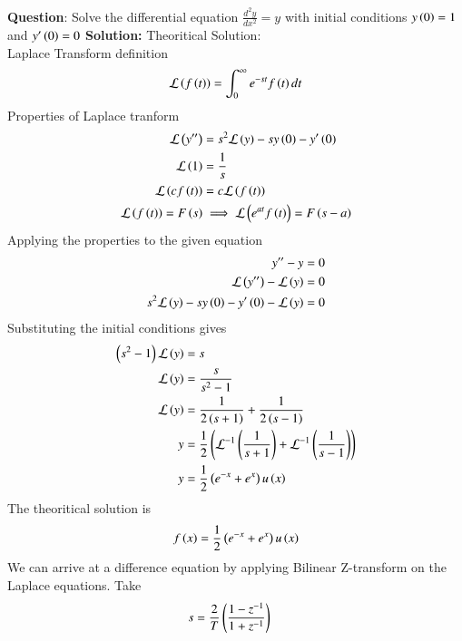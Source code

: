 \documentclass[journal]{IEEEtran}
\begin{document}
\textbf{Question}:\newline
Solve the differential equation $\frac{d^2y}{dx^2} = y$ with initial conditions $y\left(0\right) = 1$ and $y^{\prime}\left(0\right) = 0$
\newline
\textbf{Solution: }
\newline
Theoritical Solution:\\
Laplace Transform definition\\
\begin{align}
	\mathcal{L}\left(f\left(t\right)\right) = \int_{0}^{\infty}e^{-st}f\left(t\right)dt
\end{align}
Properties of Laplace tranform
\begin{align}
	\mathcal{L}\left(y^{\prime\prime}\right) &= s^2\mathcal{L}\left(y\right) -sy\left(0\right)-y^\prime\left(0\right)\\
	\mathcal{L}\left(1\right) &= \frac{1}{s}\\
	\mathcal{L}\left(cf\left(t\right)\right) &= c\mathcal{L}\left(f\left(t\right)\right)\\
	\mathcal{L}\left(f\left(t\right)\right) = F\left(s\right) &\implies \mathcal{L}\left(e^{at}f\left(t\right)\right) = F\left(s-a\right)
\end{align}
Applying the properties to the given equation
\begin{align}
	y^{\prime\prime} - y &= 0\\
	\mathcal{L}\left(y^{\prime\prime}\right) - \mathcal{L}\left(y\right) &= 0\\
	s^2\mathcal{L}\left(y\right) -sy\left(0\right)-y^\prime\left(0\right)-\mathcal{L}\left(y\right) &= 0\\
\end{align}
Substituting the initial conditions gives
\begin{align}
	\left(s^2-1\right)\mathcal{L}\left(y\right)&= s\\
	\mathcal{L}\left(y\right) &= \frac{s}{s^2 - 1}\\
	 \mathcal{L}\left(y\right) &= \frac{1}{2\left(s+1\right)}+\frac{1}{2\left(s-1\right)}\\
	y &= \frac{1}{2}\left(\mathcal{L}^{-1}\left(\frac{1}{s+1}\right)+\mathcal{L}^{-1}\left(\frac{1}{s-1}\right)\right)\\
	y &= \frac{1}{2}\left(e^{-x}+e^{x}\right)u\left(x\right)
\end{align}
The theoritical solution is 
\begin{align}
	f\left(x\right) = \frac{1}{2}\left(e^{-x}+e^{x}\right)u\left(x\right)
\end{align}
We can arrive at a difference equation by applying Bilinear Z-transform on the Laplace equations. Take
\begin{align}
	s &= \frac{2}{T}\left(\frac{1-z^{-1}}{1+z^{-1}}\right)
\end{align}
\end{document}

